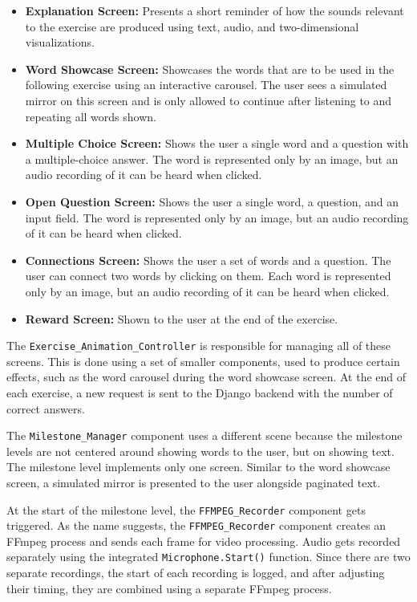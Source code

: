 \begin{itemize}
    \item \textbf{Explanation Screen:} Presents a short reminder of how the sounds relevant to the exercise are produced using text, audio, and two-dimensional visualizations.
    \item \textbf{Word Showcase Screen:} Showcases the words that are to be used in the following exercise using an interactive carousel. The user sees a simulated mirror on this screen and is only allowed to continue after listening to and repeating all words shown.
    \item \textbf{Multiple Choice Screen:} Shows the user a single word and a question with a multiple-choice answer. The word is represented only by an image, but an audio recording of it can be heard when clicked.
    \item \textbf{Open Question Screen:} Shows the user a single word, a question, and an input field. The word is represented only by an image, but an audio recording of it can be heard when clicked.
    \item \textbf{Connections Screen:} Shows the user a set of words and a question. The user can connect two words by clicking on them. Each word is represented only by an image, but an audio recording of it can be heard when clicked.
    \item \textbf{Reward Screen:} Shown to the user at the end of the exercise.
\end{itemize}

The \texttt{Exercise\_Animation\_Controller} is responsible for managing all of these screens. This is done using a set of smaller components, used to produce certain effects, such as the word carousel during the word showcase screen. At the end of each exercise, a new request is sent to the Django backend with the number of correct answers.

The \texttt{Milestone\_Manager} component uses a different scene because the milestone levels are not centered around showing words to the user, but on showing text. The milestone level implements only one screen. Similar to the word showcase screen, a simulated mirror is presented to the user alongside paginated text.

At the start of the milestone level, the \texttt{FFMPEG\_Recorder} component gets triggered. As the name suggests, the \texttt{FFMPEG\_Recorder} component creates an FFmpeg process and sends each frame for video processing. Audio gets recorded separately using the integrated \texttt{Microphone.Start()} function. Since there are two separate recordings, the start of each recording is logged, and after adjusting their timing, they are combined using a separate FFmpeg process.

